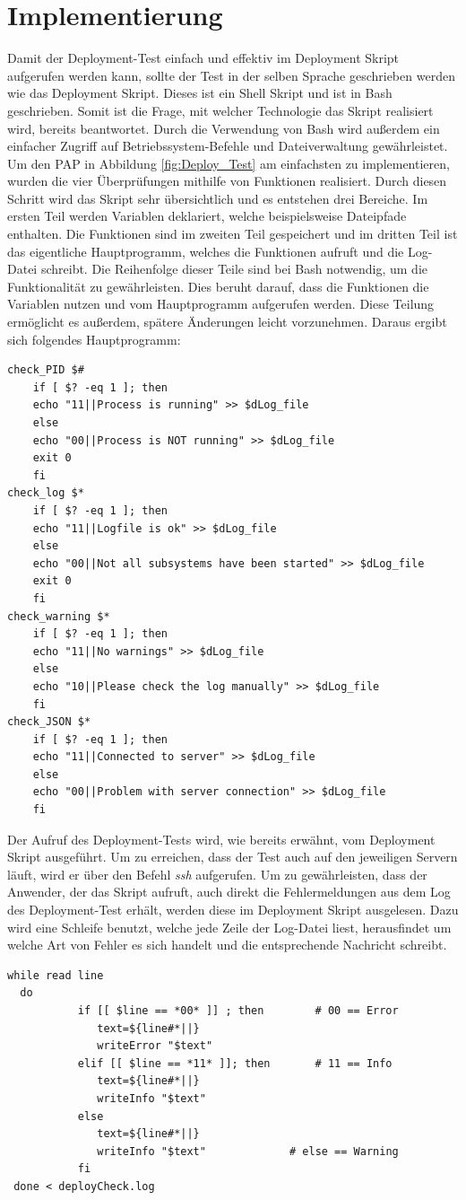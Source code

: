 \section{Implementierung}
Damit der Deployment-Test einfach und effektiv im Deployment Skript aufgerufen werden kann, sollte der Test in der selben Sprache geschrieben werden wie das Deployment  Skript. Dieses ist ein Shell Skript und ist in \acs{Bash} geschrieben. Somit ist die Frage, mit welcher Technologie das Skript realisiert wird, bereits beantwortet. Durch die Verwendung von \acs{Bash} wird außerdem ein einfacher Zugriff auf Betriebssystem-Befehle und Dateiverwaltung gewährleistet.\\
Um den \acs{PAP} in Abbildung \ref{fig:Deploy_Test} am einfachsten zu implementieren, wurden die vier Überprüfungen mithilfe von Funktionen realisiert. Durch diesen Schritt wird das Skript sehr übersichtlich und es entstehen drei Bereiche. Im ersten Teil werden Variablen deklariert, welche beispielsweise Dateipfade enthalten. Die Funktionen sind im zweiten Teil gespeichert und im dritten Teil ist das eigentliche Hauptprogramm, welches die Funktionen aufruft und die Log-Datei schreibt. Die Reihenfolge dieser Teile sind bei \acs{Bash} notwendig, um die Funktionalität zu gewährleisten. Dies beruht darauf, dass die Funktionen die Variablen nutzen und vom Hauptprogramm aufgerufen werden. Diese Teilung ermöglicht es außerdem, spätere Änderungen leicht vorzunehmen. Daraus ergibt sich folgendes Hauptprogramm:
\begin{lstlisting}
check_PID $#     
	if [ $? -eq 1 ]; then
	echo "11||Process is running" >> $dLog_file
	else
	echo "00||Process is NOT running" >> $dLog_file
	exit 0
	fi
check_log $*     
	if [ $? -eq 1 ]; then
	echo "11||Logfile is ok" >> $dLog_file
	else
	echo "00||Not all subsystems have been started" >> $dLog_file
	exit 0
	fi
check_warning $*
	if [ $? -eq 1 ]; then
	echo "11||No warnings" >> $dLog_file
	else 
	echo "10||Please check the log manually" >> $dLog_file
	fi
check_JSON $*
	if [ $? -eq 1 ]; then
	echo "11||Connected to server" >> $dLog_file
	else
	echo "00||Problem with server connection" >> $dLog_file
	fi

\end{lstlisting}

Der Aufruf des Deployment-Tests wird, wie bereits erwähnt, vom Deployment Skript ausgeführt. Um zu erreichen, dass der Test auch auf den jeweiligen Servern läuft, wird er über den Befehl \textit{ssh} aufgerufen. Um zu gewährleisten, dass der Anwender, der das Skript aufruft, auch direkt die Fehlermeldungen aus dem Log des Deployment-Test erhält, werden diese im Deployment Skript ausgelesen. Dazu wird eine Schleife benutzt, welche jede Zeile der Log-Datei liest, herausfindet um welche Art von Fehler es sich handelt und die entsprechende Nachricht schreibt.
\begin{lstlisting}
while read line 
  do 
		   if [[ $line == *00* ]] ; then		# 00 == Error
		      text=${line#*||}
		      writeError "$text"			
		   elif [[ $line == *11* ]]; then		# 11 == Info
		      text=${line#*||}
		      writeInfo "$text"	  
		   else 
		      text=${line#*||}
		      writeInfo "$text"				# else == Warning
		   fi
 done < deployCheck.log
\end{lstlisting}

